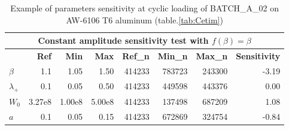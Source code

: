 \begin{table}[!h]
	\centering
	\begin{tabular}{lrrrrrrr}
		\hline
		\multicolumn{8}{c}{\textbf{Constant amplitude sensitivity test with $f(\beta)=\beta$}}                                                                                                                                                                                                                                           \\ \hline
		& \multicolumn{1}{r}{\textbf{Ref}} & \multicolumn{1}{r}{\textbf{Min}} & \multicolumn{1}{r}{\textbf{Max}} & \multicolumn{1}{r}{\textbf{Ref\_n}} & \multicolumn{1}{r}{\textbf{Min\_n}} & \multicolumn{1}{r}{\textbf{Max\_n}} & \multicolumn{1}{r}{\textbf{Sensitivity}} \\ \hline
		\textbf{$\beta$}   & 1.1                                          & 1.05                             & 1.50                             & 414233                                     & 
		783723 	                              & 243300 
		&-3.19 
		\\
		\textbf{$\lambda_+$} & 0.1                                          & 0.05                             & 0.50                             & 414233                                    & 449598 
		& 443376 
		& 0.00                                    \\
		\textbf{$W_0$}     & 3.27e8                                     & 1.00e8                         & 5.00e8                         & 414233                                     & 137498 
		& 687209 
		& 1.08                                    \\
		\textbf{$a$}       & 0.1                                          & 0.05                             & 0.15                             & 414233                                  & 672869 
		& 324754 
		& -0.84                                   \\ \hline
	\end{tabular}
	\caption{Example of parameters sensitivity at cyclic loading of BATCH\_A\_02 on AW-6106 T6 aluminum (table.\ref{tab:Cetim})}
	\label{tab.sensitivity_const1}
\end{table}

\clearpage
